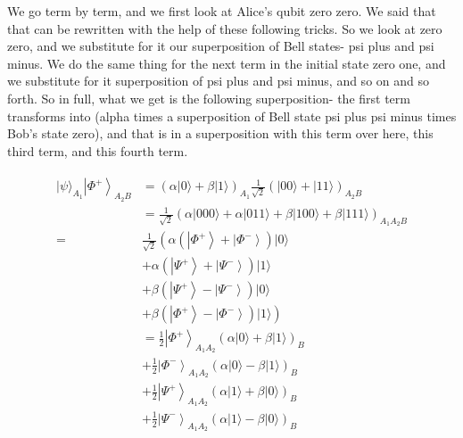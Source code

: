 We go term by term, and we first look at Alice's qubit zero zero. We said that that can be rewritten with the help of these following tricks. So we look at zero zero, and we substitute for it our superposition of Bell states- psi plus and psi minus. We do the same thing for the next term in the initial state zero one, and we substitute for it superposition of psi plus and psi minus, and so on and so forth. So in full, what we get is the following superposition- the first term transforms into (alpha times a superposition of Bell state psi plus psi minus times Bob's state zero), and that is in a superposition with this term over here, this third term, and this fourth term.

\begin{align}
    \begin{aligned}
|\psi\rangle_{A_{1}}\left|\Phi^{+}\right\rangle_{A_{2} B} &=(\alpha|0\rangle+\beta|1\rangle)_{A_{1}} \frac{1}{\sqrt{2}}(|00\rangle+|11\rangle)_{A_{2} B} \\
&=\frac{1}{\sqrt{2}}(\alpha|000\rangle+\alpha|011\rangle+\beta|100\rangle+\beta|111\rangle)_{A_{1} A_{2} B} \\
=& \frac{1}{\sqrt{2}}\left(\alpha\left(\left|\Phi^{+}\right\rangle+\left|\Phi^{-}\right\rangle\right)|0\rangle\right.\\
&+\alpha\left(\left|\Psi^{+}\right\rangle+\left|\Psi^{-}\right\rangle\right)|1\rangle \\
&+\beta\left(\left|\Psi^{+}\right\rangle-\left|\Psi^{-}\right\rangle\right)|0\rangle \\
&\left.+\beta\left(\left|\Phi^{+}\right\rangle-\left|\Phi^{-}\right\rangle\right)|1\rangle\right) \\
&=\frac{1}{2}\left|\Phi^{+}\right\rangle_{A_{1} A_{2}}(\alpha|0\rangle+\beta|1\rangle)_{B} \\
&+\frac{1}{2}\left|\Phi^{-}\right\rangle_{A_{1} A_{2}}(\alpha|0\rangle-\beta|1\rangle)_{B} \\
&+\frac{1}{2}\left|\Psi^{+}\right\rangle_{A_{1} A_{2}}(\alpha|1\rangle+\beta|0\rangle)_{B} \\
&+\frac{1}{2}\left|\Psi^{-}\right\rangle_{A_{1} A_{2}}(\alpha|1\rangle-\beta|0\rangle)_{B}
\end{aligned}
\end{align}
